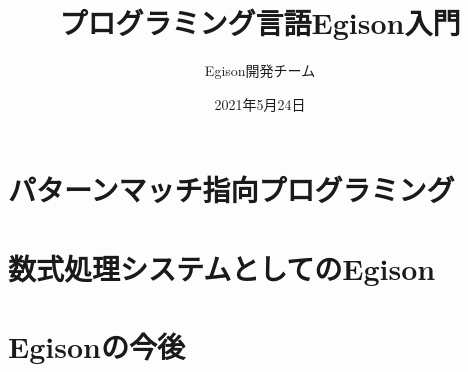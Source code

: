 \documentclass[b5paper,papersize,openany]{jsbook}
\title{プログラミング言語Egison入門}
\author{Egison開発チーム}
\date{2021年5月24日}
\theoremstyle{definition}
\begin{document}
\frontmatter

\maketitle

\setcounter{section}{0}
\setcounter{footnote}{0}


\tableofcontents

\mainmatter

\setcounter{section}{0}


\part{パターンマッチ指向プログラミング}\label{part-pmo}











%





\part{数式処理システムとしてのEgison}\label{part-cas}





%







\part{Egisonの今後}



\appendix





%

%

%

\backmatter




\printindex
\end{document}
